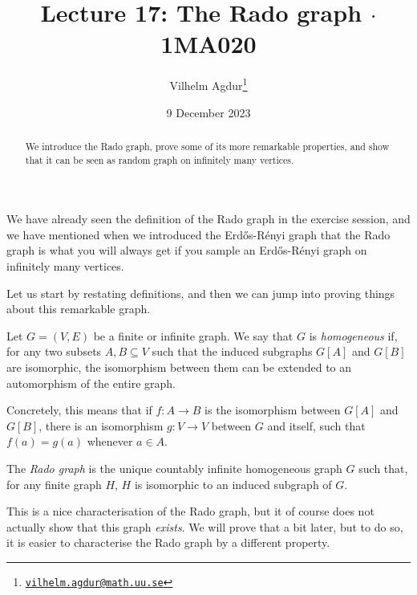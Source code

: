 \documentclass[nobib]{tufte-handout}
\title{Lecture 17: The Rado graph $\cdot$ 1MA020}
\author[Vilhelm Agdur]{Vilhelm Agdur\thanks{\href{mailto:vilhelm.agdur@math.uu.se}{\nolinkurl{vilhelm.agdur@math.uu.se}}}}
\date{9 December 2023}
\begin{document}
\maketitle%

\begin{abstract}
\noindent
We introduce the Rado graph, prove some of its more remarkable properties, and show that it can be seen as  random graph on infinitely many vertices.
\end{abstract}

We have already seen the definition of the Rado graph in the exercise session, and we have mentioned when we introduced the Erd\H{o}s-Rényi graph that the Rado graph is what you will always get if you sample an Erd\H{o}s-Rényi graph on infinitely many vertices.

Let us start by restating definitions, and then we can jump into proving things about this remarkable graph.

\begin{definition}
    Let $G = (V,E)$ be a finite or infinite graph. We say that $G$ is \emph{homogeneous} if, for any two subsets $A, B \subseteq V$ such that the induced subgraphs $G[A]$ and $G[B]$ are isomorphic, the isomorphism between them can be extended to an automorphism of the entire graph.
  
    Concretely, this means that if $f: A \to B$ is the isomorphism between $G[A]$ and $G[B]$, there is an isomorphism $g: V \to V$ between $G$ and itself, such that $f(a) = g(a)$ whenever $a \in A$.
\end{definition}

\begin{definition}
    The \emph{Rado graph} is the unique countably infinite homogeneous graph $G$ such that, for any finite graph $H$, $H$ is isomorphic to an induced subgraph of $G$.
\end{definition}

This is a nice characterisation of the Rado graph, but it of course does not actually show that this graph \emph{exists}. We will prove that a bit later, but to do so, it is easier to characterise the Rado graph by a different property.
\end{document}

